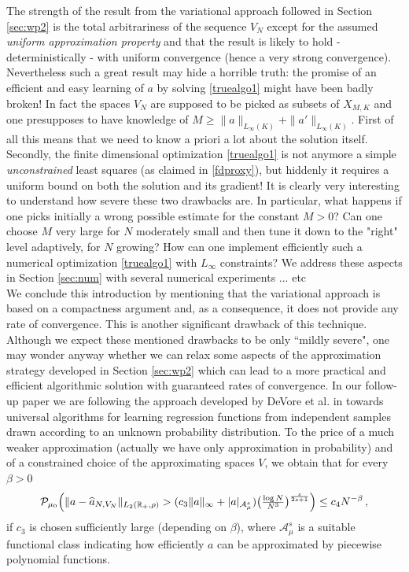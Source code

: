 \documentclass[A4paper,11pt]{article}
\theoremstyle{definition}
\newcommand{\R}{\mathbb{R}}
\begin{document}
The strength of the result from the variational approach followed in Section \ref{sec:wp2} is the total arbitrariness of the sequence $V_N$ except
for the assumed {\it uniform approximation property} and that the result is likely to hold - deterministically - with uniform convergence (hence a very strong convergence). Nevertheless such 
a great result may  hide a horrible truth: the promise of an efficient and easy learning of $a$ by solving \eqref{truealgo1} might have been badly broken! In fact the spaces $V_N$ are supposed
to be picked as subsets of $X_{M,K}$ and one presupposes to have knowledge of $M \geq \|a\|_{L_{\infty}(K)} + \|a'\|_{L_{\infty}(K)}$. First of all this means that we need
to know a priori a lot about the solution itself. Secondly, the finite dimensional optimization \eqref{truealgo1} is not anymore a simple {\it unconstrained} least squares (as claimed in \eqref{fdproxy}),
but hiddenly it requires a uniform bound on both the solution and its gradient! It is clearly very interesting to understand how severe these two drawbacks are. In particular, what happens
if one picks initially a wrong possible estimate for the constant $M>0$? Can one choose $M$ very large for $N$ moderately small and then tune it  down to the "right" level adaptively, for $N$ growing?
How can one implement efficiently such a numerical optimization \eqref{truealgo1} with $L_\infty$ constraints?
We address these aspects in Section \ref{sec:num} with several numerical experiments ... etc
 \\
We conclude this introduction by mentioning that the variational approach is based on a compactness argument and, as a consequence, it does not provide any rate of convergence. This is another significant drawback of this technique.
\\
Although we expect these mentioned drawbacks to be only ``mildly severe", one may wonder anyway whether we can relax some aspects of the approximation strategy developed
in Section \ref{sec:wp2} which can lead to a more practical and efficient algorithmic solution with guaranteed rates of convergence.
In our follow-up paper \cite{} we are following the approach developed by DeVore et al. in \cite{MR2249856,MR2327596} towards universal algorithms for learning regression functions from independent samples drawn according to an unknown probability distribution. To the price of a much weaker approximation (actually we have only approximation in probability) and of a constrained choice of the approximating spaces $V$, we obtain that for every $\beta>0$
	\begin{equation}\label{finalestimate}
		\mathcal P_{\mu_0} \Bigl(\|a- \widehat a_{N,V_N}\|_{L_2(\R_+,\rho)}
			>(c_3\|a\|_\infty+|a|_{\mathcal{A}^s_\mu})\bigl(\tfrac{\log N}{N^3}\bigr)^{\frac{s}{2s+1}}\Bigr)
			\leq c_4 N^{-\beta}\,,
	\end{equation}
	if $c_3$ is chosen sufficiently large (depending on $\beta$), where $\mathcal{A}^s_\mu$ is a suitable functional class indicating how efficiently $a$ can be approximated by piecewise polynomial functions. \\
\end{document}
